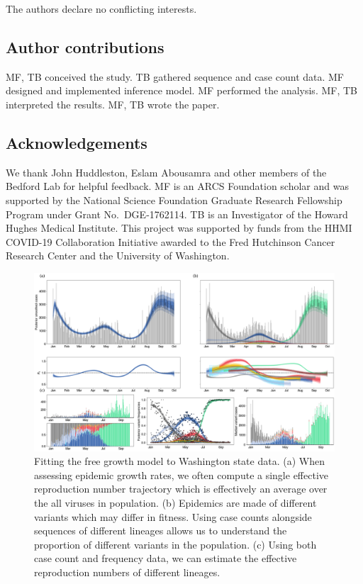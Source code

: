 \documentclass[11pt,oneside,letterpaper]{article}
\begin{document}
The authors declare no conflicting interests.

\subsection*{Author contributions}

MF, TB conceived the study.
TB gathered sequence and case count data.
MF designed and implemented inference model.
MF performed the analysis.
MF, TB interpreted the results.
MF, TB wrote the paper.

\subsection*{Acknowledgements}%

We thank John Huddleston, Eslam Abousamra and other members of the Bedford Lab for helpful feedback.
MF is an ARCS Foundation scholar and was supported by the National Science Foundation Graduate Research Fellowship Program under Grant No.\ DGE-1762114.
TB is an Investigator of the Howard Hughes Medical Institute.
This project was supported by funds from the HHMI COVID-19 Collaboration Initiative awarded to the Fred Hutchinson Cancer Research Center and the University of Washington.

\begin{figure}
  \centering
  \includegraphics[width=\linewidth]{figs/fig_1.png}
  \caption{ Fitting the free growth model to Washington state data.
    (a) When assessing epidemic growth rates, we often compute a single effective reproduction number trajectory which is effectively an average over the all viruses in population.
    (b) Epidemics are made of different variants which may differ in fitness. Using case counts alongside sequences of different lineages allows us to understand the proportion of different variants in the population.
(c) Using both case count and frequency data, we can estimate the effective reproduction numbers of different lineages.}%
  \label{fig:1}
\end{figure}
\end{document}
